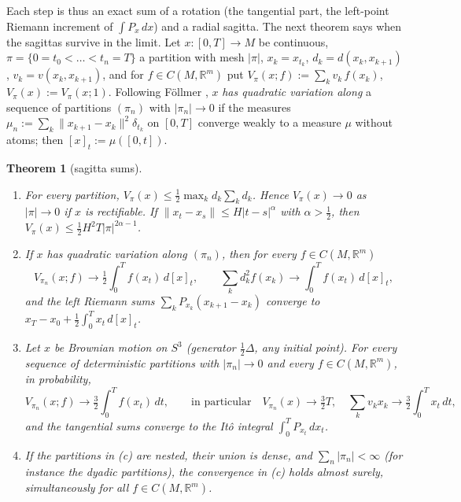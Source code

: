 \documentclass[11pt,reqno]{amsart}
\newtheorem{theorem}{Theorem}[section]
\theoremstyle{definition}
\theoremstyle{remark}
\numberwithin{equation}{section}
\newcommand{\R}{\mathbb{R}}
\begin{document}
Each step is thus an exact sum of a rotation (the tangential part, the left-point Riemann increment of
$\int P_x\,dx$) and a radial sagitta.  The next theorem says when the sagittas survive in the limit.  Let
$x\colon[0,T]\to M$ be continuous, $\pi=\{0=t_0<\dots<t_n=T\}$ a partition with mesh $\lvert\pi\rvert$,
$x_k=x_{t_k}$, $d_k=d(x_k,x_{k+1})$, $v_k=v(x_k,x_{k+1})$, and for $f\in C(M,\R^m)$ put
$V_\pi(x;f):=\sum_kv_k\,f(x_k)$, $V_\pi(x):=V_\pi(x;1)$.  Following F\"ollmer \cite{Follmer}, $x$
\emph{has quadratic variation along} a sequence of partitions $(\pi_n)$ with $\lvert\pi_n\rvert\to0$ if the
measures $\mu_n:=\sum_k\lVert x_{k+1}-x_k\rVert^2\delta_{t_k}$ on $[0,T]$ converge weakly to a measure $\mu$
without atoms; then $[x]_t:=\mu([0,t])$.

\begin{theorem}[sagitta sums]\label{thm:sagitta}
\begin{enumerate}[label=(\alph*)]
\item For every partition, $V_\pi(x)\le\tfrac12\max_kd_k\sum_kd_k$.  Hence $V_\pi(x)\to0$ as
$\lvert\pi\rvert\to0$ if $x$ is rectifiable.  If $\lVert x_t-x_s\rVert\le H\lvert t-s\rvert^\alpha$ with
$\alpha>\tfrac12$, then $V_\pi(x)\le\tfrac12H^2T\lvert\pi\rvert^{2\alpha-1}$.
\item If $x$ has quadratic variation along $(\pi_n)$, then for every $f\in C(M,\R^m)$
\[
V_{\pi_n}(x;f)\to\tfrac12\int_0^Tf(x_t)\,d[x]_t,\qquad \sum_kd_k^2f(x_k)\to\int_0^Tf(x_t)\,d[x]_t,
\]
and the left Riemann sums $\sum_kP_{x_k}(x_{k+1}-x_k)$ converge to $x_T-x_0+\tfrac12\int_0^Tx_t\,d[x]_t$.
\item Let $x$ be Brownian motion on $S^3$ (generator $\tfrac12\Delta$, any initial point).  For every sequence of
deterministic partitions with $\lvert\pi_n\rvert\to0$ and every $f\in C(M,\R^m)$, in probability,
\[
V_{\pi_n}(x;f)\to\tfrac32\int_0^Tf(x_t)\,dt,\qquad\text{in particular}\quad V_{\pi_n}(x)\to\tfrac32T,\quad
\sum_kv_kx_k\to\tfrac32\int_0^Tx_t\,dt,
\]
and the tangential sums converge to the It\^o integral $\int_0^TP_{x_t}\,dx_t$.
\item If the partitions in (c) are nested, their union is dense, and $\sum_n\lvert\pi_n\rvert<\infty$ (for instance the
dyadic partitions), the convergence in (c) holds almost surely, simultaneously for all $f\in C(M,\R^m)$.
\end{enumerate}
\end{theorem}
\end{document}
